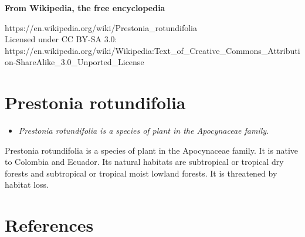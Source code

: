 \textbf{From Wikipedia, the free encyclopedia}

https://en.wikipedia.org/wiki/Prestonia\_rotundifolia\\
Licensed under CC BY-SA 3.0:\\
https://en.wikipedia.org/wiki/Wikipedia:Text\_of\_Creative\_Commons\_Attribution-ShareAlike\_3.0\_Unported\_License

\section{Prestonia rotundifolia}\label{prestonia-rotundifolia}

\begin{itemize}
\item
  \emph{Prestonia rotundifolia is a species of plant in the Apocynaceae
  family.}
\end{itemize}

Prestonia rotundifolia is a species of plant in the Apocynaceae family.
It is native to Colombia and Ecuador. Its natural habitats are
subtropical or tropical dry forests and subtropical or tropical moist
lowland forests. It is threatened by habitat loss.

\section{References}\label{references}
